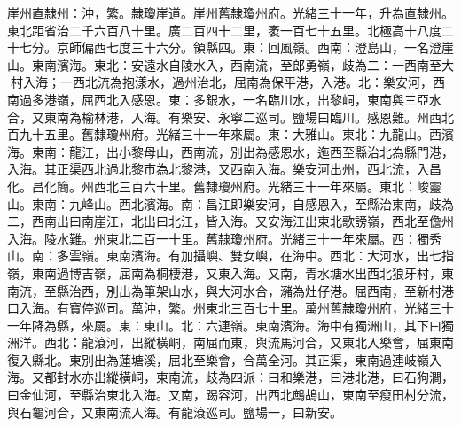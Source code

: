 \begin{pinyinscope}
崖州直隸州：沖，繁。隸瓊崖道。崖州舊隸瓊州府。光緒三十一年，升為直隸州。東北距省治二千六百八十里。廣二百四十二里，袤一百七十五里。北極高十八度二十七分。京師偏西七度三十六分。領縣四。東：回風嶺。西南：澄島山，一名澄崖山。東南濱海。東北：安遠水自陵水入，西南流，至郎勇嶺，歧為二：一西南至大村入海；一西北流為抱漾水，過州治北，屈南為保平港，入港。北：樂安河，西南過多港嶺，屈西北入感恩。東：多銀水，一名臨川水，出黎峒，東南與三亞水合，又東南為榆林港，入海。有樂安、永寧二巡司。鹽場曰臨川。感恩難。州西北百九十五里。舊隸瓊州府。光緒三十一年來屬。東：大雅山。東北：九龍山。西濱海。東南：龍江，出小黎母山，西南流，別出為感恩水，迤西至縣治北為縣門港，入海。其正渠西北過北黎市為北黎港，又西南入海。樂安河出州，西北流，入昌化。昌化簡。州西北三百六十里。舊隸瓊州府。光緒三十一年來屬。東北：峻靈山。東南：九峰山。西北濱海。南：昌江即樂安河，自感恩入，至縣治東南，歧為二，西南出曰南崖江，北出曰北江，皆入海。又安海江出東北歌謗嶺，西北至儋州入海。陵水難。州東北二百一十里。舊隸瓊州府。光緒三十一年來屬。西：獨秀山。南：多雲嶺。東南濱海。有加攝嶼、雙女嶼，在海中。西北：大河水，出七指嶺，東南過博吉嶺，屈南為桐棲港，又東入海。又南，青水塘水出西北狼牙村，東南流，至縣治西，別出為筆架山水，與大河水合，瀦為灶仔港。屈西南，至新村港口入海。有寶停巡司。萬沖，繁。州東北三百七十里。萬州舊隸瓊州府，光緒三十一年降為縣，來屬。東：東山。北：六連嶺。東南濱海。海中有獨洲山，其下曰獨洲洋。西北：龍滾河，出縱橫峒，南屈而東，與流馬河合，又東北入樂會，屈東南復入縣北。東別出為蓮塘溪，屈北至樂會，合萬全河。其正渠，東南過連岐嶺入海。又都封水亦出縱橫峒，東南流，歧為四派：曰和樂港，曰港北港，曰石狗澗，曰金仙河，至縣治東北入海。又南，踢容河，出西北鷓鴣山，東南至瘦田村分流，與石龜河合，又東南流入海。有龍滾巡司。鹽場一，曰新安。


\end{pinyinscope}
